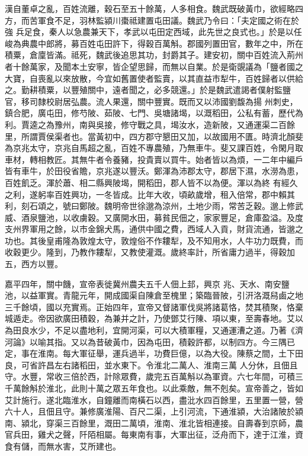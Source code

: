 \begin{pinyinscope}
 漢自董卓之亂，百姓流離，穀石至五十餘萬，人多相食。魏武既破黃巾，欲經略四方，而苦軍食不足，羽林監潁川棗祗建置屯田議。魏武乃令曰：「夫定國之術在於強
 兵足食，秦人以急農兼天下，孝武以屯田定西域，此先世之良式也。」於是以任峻為典農中郎將，募百姓屯田許下，得穀百萬斛。郡國列置田官，數年之中，所在積粟，倉廩皆滿。祗死，魏武後追思其功，封爵其子。建安初，關中百姓流入荊州者十餘萬家，及聞本土安寧，皆企望思歸，而無以自業。於是衛覬議為「鹽者國之大寶，自喪亂以來放散，今宜如舊置使者監賣，以其直益市犁牛，百姓歸者以供給之。勤耕積粟，以豐殖關中，遠者聞之，必多競還。」於是魏武遣謁者僕射監鹽官，移司隸校尉居弘農。流人果還，關中豐實。既而又以沛國劉馥為揚
 州刺史，鎮合肥，廣屯田，修芍陂、茹陂、七門、吳塘諸堨，以溉稻田，公私有蓄，歷代為利。賈逵之為豫州，南與吳接，修守戰之具，堨汝水，造新陂，又通運渠二百餘里，所謂賈侯渠者也。當黃初中，四方郡守懇田又加，以故國用不匱。時濟北顏斐為京兆太守，京兆自馬超之亂，百姓不專農殖，乃無車牛。斐又課百姓，令閑月取車材，轉相教匠。其無牛者令養豬，投貴賣以買牛。始者皆以為煩，一二年中編戶皆有車牛，於田役省贍，京兆遂以豐沃。鄭渾為沛郡太守，郡居下濕，水澇為患，百姓飢乏。渾於蕭、相二縣興陂堨，開稻田，郡人皆不以為便。渾以為終
 有經久之利，遂躬率百姓興功，一冬皆成。比年大收，頃畝歲增，租入倍常，郡中賴其利，刻石頌之，號曰鄭陂。魏明帝世徐邈為涼州，土地少雨，常苦乏穀。邈上修武威、酒泉鹽池，以收虜穀。又廣開水田，募貧民佃之，家家豐足，倉庫盈溢。及度支州界軍用之餘，以市金錦犬馬，通供中國之費，西域人入貢，財貨流通，皆邈之功也。其後皇甫隆為敦煌太守，敦煌俗不作耬犁，及不知用水，人牛功力既費，而收穀更少。隆到，乃教作耬犁，又教使灌溉。歲終率計，所省庸力過半，得穀加五，西方以豐。



 嘉平四年，關中饑，宣帝表徙冀州農夫五千人佃上邽，興京
 兆、天水、南安鹽池，以益軍實。青龍元年，開成國渠自陳倉至槐里；築臨晉陂，引汧洛溉舄鹵之地三千餘頃，國以充實焉。正始四年，宣帝又督諸軍伐吳將諸葛恪，焚其積聚，恪棄城遁走。帝因欲廣田積穀，為兼并之計，乃使鄧艾行陳、項以東，至壽春地。艾以為田良水少，不足以盡地利，宜開河渠，可以大積軍糧，又通運漕之道。乃著《濟河論》以喻其指。又以為昔破黃巾，因為屯田，積穀許都，以制四方。今三隅已定，事在淮南。每大軍征舉，運兵過半，功費巨億，以為大役。陳蔡之間，土下田良，可省許昌左右諸稻田，並水東下。令淮北二萬人、淮南三萬
 人分休，且佃且守。水豐，常收三倍於西，計除眾費，歲完五百萬斛以為軍資。六七年間，可積三千萬餘斛於淮北，此則十萬之眾五年食也。以此乘敵，無不剋矣。宣帝善之，皆如艾計施行。遂北臨淮水，自鐘離而南橫石以西，盡沘水四百餘里，五里置一營，營六十人，且佃且守。兼修廣淮陽、百尺二渠，上引河流，下通淮潁，大治諸陂於潁南、潁北，穿渠三百餘里，溉田二萬頃，淮南、淮北皆相連接。自壽春到京師，農官兵田，雞犬之聲，阡陌相屬。每東南有事，大軍出征，泛舟而下，達于江淮，資食有儲，而無水害，艾所建也。




\end{pinyinscope}
